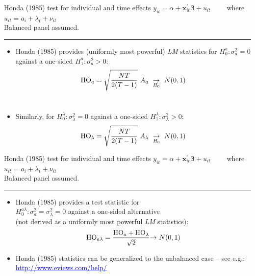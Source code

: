 \documentclass[usenames,dvipsnames]{beamer}
\begin{document}
\begin{frame}{Honda (1985) test for individual and time effects}
$y_{it} = \alpha + \bm{x}^{\prime}_{it} \bm{\beta} + u_{it} \qquad$    where $u_{it}=a_i + \lambda_t + \nu_{it} \qquad$ \\Balanced panel assumed.\\ \vspace{0.3cm} \hrule \medskip
\begin{itemize}
    \item Honda (1985) provides (uniformly most powerful) {\it LM} statistics for $H_0^{a}: \sigma_{a}^2=0$ against a one-sided $H_1^{a}: \sigma_{a}^2>0$:
    $$
    \textnormal{HO}_{a} = \sqrt{\frac{NT}{2(T-1)}} ~ A_{a} ~ \underset{H_0}{\rightarrow}~N(0,1)
    $$ \\ \medskip
    \item Similarly, for $H_0^{\lambda}: \sigma_{\lambda}^2=0$ against a one-sided $H_1^{\lambda}: \sigma_{\lambda}^2>0$:
    $$
    \textnormal{HO}_{\lambda} = \sqrt{\frac{NT}{2(T-1)}} ~ A_{\lambda} ~ \underset{H_0}{\rightarrow}~N(0,1)
    $$
\end{itemize}    
\end{frame}
\begin{frame}{Honda (1985) test for individual and time effects}
$y_{it} = \alpha + \bm{x}^{\prime}_{it} \bm{\beta} + u_{it} \qquad$    where $u_{it}=a_i + \lambda_t + \nu_{it} \qquad$ \\Balanced panel assumed.\\ \vspace{0.3cm} \hrule \medskip
\begin{itemize}
    \item Honda (1985) provides a test statistic for\\ \vspace{0.3cm} $H_0^{a \lambda}: \sigma_{a}^2=\sigma_{\lambda}^2=0$ against a one-sided alternative
    \\(not derived as a uniformly most powerful {\it LM} statistics):\\ \medskip
    $$
    \textnormal{HO}_{a \lambda} = \frac{\textnormal{HO}_{a}+\textnormal{HO}_{\lambda}}{\sqrt{2}} {\rightarrow}~N(0,1)
    $$
    \medskip
    \item Honda (1985) statistics can be generalized to the unbalanced case -- see e.g.: \footnotesize{\textcolor{blue}{\underline{http://www.eviews.com/help/}}}
\end{itemize}    
\end{frame}
\end{document}
